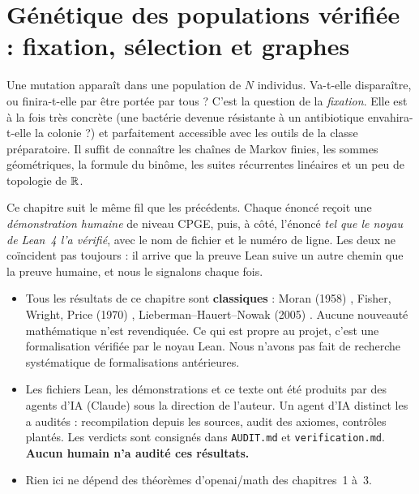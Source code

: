 \chapter{Génétique des populations vérifiée : fixation, sélection et graphes}
\label{ch4:debut}\label{ch4:chapitre}
\sloppy

Une mutation apparaît dans une population de $N$ individus. Va-t-elle disparaître, ou finira-t-elle par être
portée par tous ? C'est la question de la \emph{fixation}. Elle est à la fois très concrète (une bactérie
devenue résistante à un antibiotique envahira-t-elle la colonie ?) et parfaitement accessible avec les outils de
la classe préparatoire. Il suffit de connaître les chaînes de Markov finies, les sommes géométriques, la
formule du binôme, les suites récurrentes linéaires et un peu de topologie de $\mathbb{R}$.

Ce chapitre suit le même fil que les précédents. Chaque énoncé reçoit une \emph{démonstration humaine} de niveau
CPGE, puis, à côté, l'énoncé \emph{tel que le noyau de Lean~4 l'a vérifié}, avec le nom de fichier et le numéro
de ligne. Les deux ne coïncident pas toujours : il arrive que la preuve Lean suive un autre chemin que la
preuve humaine, et nous le signalons chaque fois.

\begin{warnbox}
\begin{itemize}[leftmargin=1.2em,itemsep=1pt]
\item Tous les résultats de ce chapitre sont \textbf{classiques} : Moran (1958) \cite{ch4:Mor}, Fisher, Wright,
Price (1970) \cite{ch4:Pri70}, Lieberman--Hauert--Nowak (2005) \cite{ch4:LHN}. Aucune nouveauté mathématique n'est revendiquée. Ce qui est propre au projet,
c'est une formalisation vérifiée par le noyau Lean. Nous n'avons pas fait de recherche systématique de
formalisations antérieures.
\item Les fichiers Lean, les démonstrations et ce texte ont été produits par des agents d'IA (Claude) sous la
direction de l'auteur. Un agent d'IA distinct les a audités : recompilation depuis les sources, audit des
axiomes, contrôles plantés. Les verdicts sont consignés dans \texttt{AUDIT.md} et \texttt{verification.md}.
\textbf{Aucun humain n'a audité ces résultats.}
\item Rien ici ne dépend des théorèmes d'openai/math des chapitres~1 à~3.
\end{itemize}
\end{warnbox}

